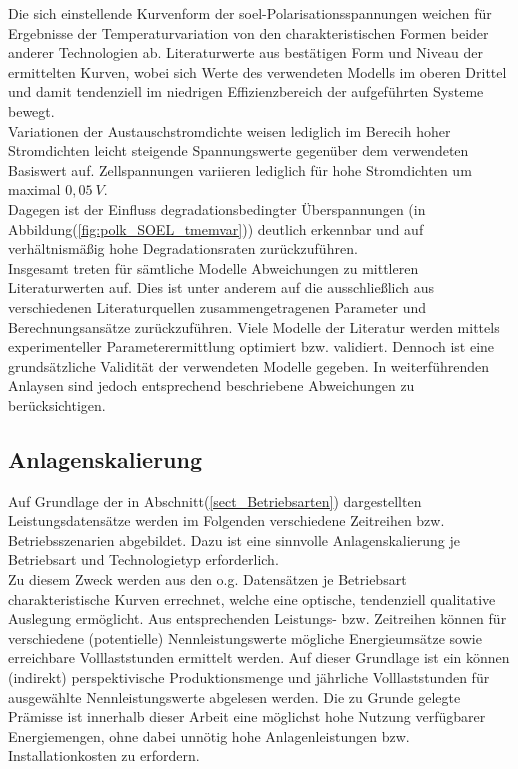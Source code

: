 \documentclass[onecolumn,10pt,titlepage]{article}
\begin{document}
Die sich einstellende Kurvenform der \gls{soel}-Polarisationsspannungen weichen für Ergebnisse der Temperaturvariation von den charakteristischen Formen beider anderer Technologien ab. Literaturwerte aus \cite{Buttler.2018} bestätigen Form und Niveau der ermittelten Kurven, wobei sich Werte des verwendeten Modells im oberen Drittel und damit tendenziell im niedrigen Effizienzbereich der aufgeführten Systeme bewegt.\\
Variationen der Austauschstromdichte weisen lediglich im Berecih hoher Stromdichten leicht steigende Spannungswerte gegenüber dem verwendeten Basiswert auf. Zellspannungen variieren lediglich für hohe Stromdichten um maximal $0,05~V$.\\
Dagegen ist der Einfluss degradationsbedingter Überspannungen (in Abbildung(\ref{fig:polk_SOEL_tmemvar})) deutlich erkennbar und auf verhältnismäßig hohe Degradationsraten zurückzuführen.\\
Insgesamt treten für sämtliche Modelle Abweichungen zu mittleren Literaturwerten auf. Dies ist unter anderem auf die ausschließlich aus verschiedenen Literaturquellen zusammengetragenen Parameter und Berechnungsansätze zurückzuführen. Viele Modelle der Literatur werden mittels experimenteller Parameterermittlung optimiert bzw. validiert. Dennoch ist eine grundsätzliche Validität der verwendeten Modelle gegeben. In weiterführenden Anlaysen sind jedoch entsprechend beschriebene Abweichungen zu berücksichtigen. 
\newpage
\subsection{Anlagenskalierung}
\label{subs_ANL_SKAL}
Auf Grundlage der in Abschnitt(\ref{sect_Betriebsarten}) dargestellten Leistungsdatensätze werden im Folgenden verschiedene Zeitreihen bzw. Betriebsszenarien abgebildet. Dazu ist eine sinnvolle Anlagenskalierung je Betriebsart und Technologietyp erforderlich.\\
Zu diesem Zweck werden aus den o.g. Datensätzen je Betriebsart charakteristische Kurven errechnet, welche eine optische, tendenziell qualitative Auslegung ermöglicht. Aus entsprechenden Leistungs- bzw. Zeitreihen können für verschiedene (potentielle) Nennleistungswerte mögliche Energieumsätze sowie erreichbare Volllaststunden ermittelt werden. Auf dieser Grundlage ist ein können (indirekt) perspektivische Produktionsmenge und jährliche Volllaststunden für ausgewählte Nennleistungswerte abgelesen werden. Die zu Grunde gelegte Prämisse ist innerhalb dieser Arbeit eine möglichst hohe Nutzung verfügbarer Energiemengen, ohne dabei unnötig hohe Anlagenleistungen bzw. Installationkosten zu erfordern.   
\end{document}
